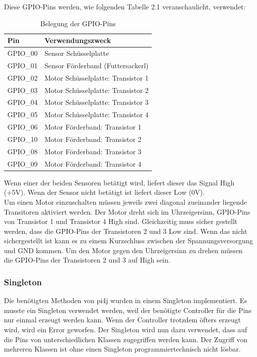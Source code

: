 \newpage

Diese GPIO-Pins werden, wie folgenden Tabelle 2.1 veranschaulicht, verwendet:

\begin{table}[htb]
\centering
\begin{tabular}{|l|l|}
\hline
\textbf{Pin} & \textbf{Verwendungszweck}          \\ \hline
GPIO\_00     & Sensor Schüsselplatte              \\ \hline
GPIO\_01     & Sensor Förderband (Futtersackerl)  \\ \hline
GPIO\_02     & Motor Schüsselplatte: Transistor 1 \\ \hline
GPIO\_03     & Motor Schüsselplatte: Transistor 2 \\ \hline
GPIO\_04     & Motor Schüsselplatte: Transistor 3 \\ \hline
GPIO\_05     & Motor Schüsselplatte: Transistor 4 \\ \hline
GPIO\_06     & Motor Förderband: Transistor 1     \\ \hline
GPIO\_10     & Motor Förderband: Transistor 2     \\ \hline
GPIO\_08     & Motor Förderband: Transistor 3     \\ \hline
GPIO\_09     & Motor Förderband: Transistor 4     \\ \hline
\end{tabular}
\caption{Belegung der GPIO-Pins}
\label{Pinbelegung}
\end{table}

Wenn einer der beiden Sensoren betätigt wird, liefert dieser das Signal High (+5V). Wenn der Sensor nicht betätigt ist liefert dieser Low (0V). 
\\ Um einen Motor einzuschalten müssen jeweils zwei diagonal zueinander liegende Transitoren aktiviert werden. Der Motor dreht sich im Uhrzeigersinn, GPIO-Pins von Transistor 1 und Transistor 4 High sind. Gleichzeitig muss sicher gestellt werden, dass die GPIO-Pins der Transistoren 2 und 3 Low sind. Wenn das nicht sichergestellt ist kann es zu einem Kurzschluss zwischen der Spannungsversorgung und GND kommen. Um den Motor gegen den Uhrzeigersinn zu drehen müssen die GPIO-Pins der Transistoren 2 und 3 auf High sein. 

\subsubsection{Singleton}
Die benötigten Methoden von pi4j wurden in einem Singleton implementiert. Es musste ein Singleton verwendet werden, weil der benötigte Controller für die Pins nur einmal erzeugt werden kann. Wenn der Controller trotzdem öfters erzeugt wird, wird  ein Error geworfen. Der Singleton wird nun dazu verwendet, dass auf die Pins von unterschiedlichen Klassen zugegriffen werden kann. Der Zugriff von mehreren Klassen ist ohne einen Singleton programmiertechnisch nicht lösbar.

